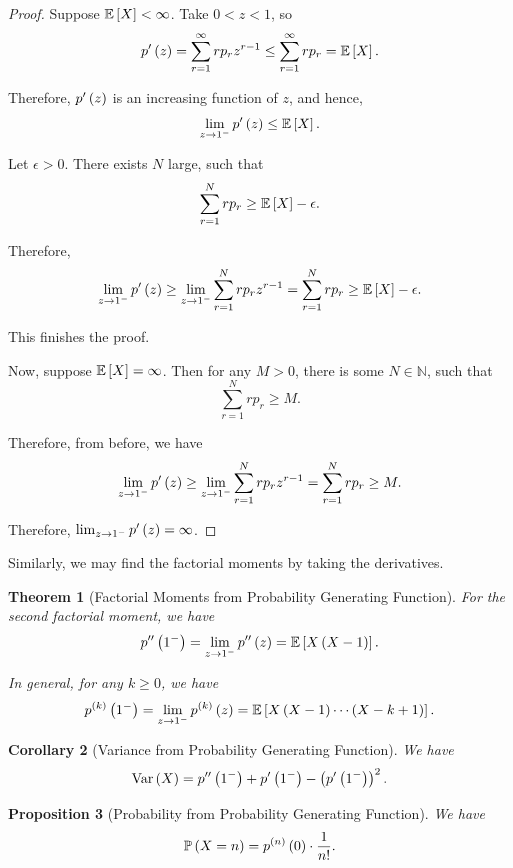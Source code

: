 \documentclass{article}
\newtheorem{theorem}{Theorem}[section]
\newtheorem{proposition}[theorem]{Proposition}
\newtheorem{corollary}[theorem]{Corollary}
\theoremstyle{definition}
\theoremstyle{remark}
\newcommand{\NN}{\mathbb{N}}
\newcommand{\Prob}{\mathbb{P}}
\newcommand{\Expt}{\mathbb{E}}
\newcommand{\Var}{\operatorname{Var}}
\begin{document}
\begin{proof}
    Suppose \(\Expt\bqty{X} < \infty\). Take \(0 < z < 1\), so
    \[
        p'\pqty{z} = \sum_{r = 1}^{\infty} r p_r z^{r - 1} \leq \sum_{r = 1}^{\infty} r p_r = \Expt\bqty{X}.
    \]

    Therefore, \(p'\left(z\right)\) is an increasing function of \(z\), and hence,
    \[
        \lim_{z \to 1^{-}} p'\pqty{z} \leq \Expt\bqty{X}.
    \]

    Let \(\epsilon > 0\). There exists \(N\) large, such that
    \[
        \sum_{r = 1}^{N} r p_r \geq \Expt\bqty{X} - \epsilon.
    \]

    Therefore,
    \[
        \lim_{z \to 1^{-}} p'\pqty{z} \geq \lim_{z \to 1^{-}} \sum_{r = 1}^{N} r p_r z^{r - 1} = \sum_{r = 1}^{N} r p_r \geq \Expt\bqty{X} - \epsilon.
    \]

    This finishes the proof.

    Now, suppose \(\Expt\bqty{X} = \infty\). Then for any \(M > 0\), there is some \(N \in \NN\), such that
    \[
        \sum_{r = 1}^{N} r p_r \geq M.
    \]

    Therefore, from before, we have
    \[
        \lim_{z \to 1^{-}} p'\left(z\right) \geq \lim_{z \to 1^{-}} \sum_{r = 1}^{N} r p_r z^{r - 1} = \sum_{r = 1}^{N} r p_r \geq M.
    \]

    Therefore, \(\lim_{z \to 1^{-}} p'\left(z\right) = \infty\).
\end{proof}

Similarly, we may find the factorial moments by taking the derivatives.

\begin{theorem}[Factorial Moments from Probability Generating Function]
    \label{thm:factorial-moments-pgf}%
    For the second factorial moment, we have
    \[
        p''\pqty{1^-} = \lim_{z \to 1^-} p''\pqty{z} = \Expt\bqty{X \pqty{X - 1}}.
    \]

    In general, for any \(k \geq 0\), we have
    \[
        p^{\pqty{k}} \pqty{1^-} = \lim_{z \to 1^-} p^{\pqty{k}}\pqty{z} = \Expt\bqty{X \pqty{X - 1} \cdots \pqty{X - k + 1}}.
    \]
\end{theorem}

\begin{corollary}[Variance from Probability Generating Function]
    \label{cor:var-pgf}%
    We have
    \[
        \Var\pqty{X} = p''\pqty{1^-} + p'\pqty{1^-} - \pqty{p'\pqty{1^-}}^2.
    \]
\end{corollary}

\begin{proposition}[Probability from Probability Generating Function]
    \label{prop:prob-pgf}%
    We have
    \[
        \Prob\pqty{X = n} = p^{\pqty{n}} \pqty{0} \cdot \frac{1}{n!}.
    \]
\end{proposition}
\end{document}
